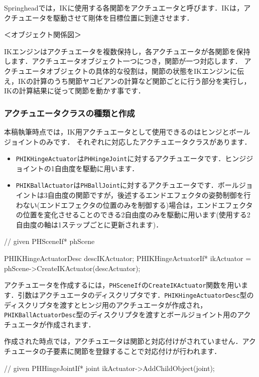 Springheadでは，IKに使用する各関節をアクチュエータと呼びます．IKは，アクチュエータを駆動させて剛体を目標位置に到達させます．

\KLUDGE ＜オブジェクト関係図＞

IKエンジンはアクチュエータを複数保持し，各アクチュエータが各関節を保持します．アクチュエータオブジェクト一つにつき，関節が一つ対応します．
\KLUDGE アクチュエータオブジェクトの具体的な役割は，関節の状態をIKエンジンに伝え，IKの計算のうち関節ヤコビアンの計算など関節ごとに行う部分を実行し，IKの計算結果に従って関節を動かす事です．


\KLUDGE %
\KLUDGE %
\subsubsection*{アクチュエータクラスの種類と作成}

\KLUDGE 本稿執筆時点では，IK用アクチュエータとして使用できるのはヒンジとボールジョイントのみです．
\KLUDGE それぞれに対応したアクチュエータクラスがあります．

\begin{itemize}
\item \texttt{PHIKHingeActuator}は\texttt{PHHingeJoint}に対するアクチュエータです．ヒンジジョイントの1自由度を駆動に用います．

\item \texttt{PHIKBallActuator}は\texttt{PHBallJoint}に対するアクチュエータです．ボールジョイントは3自由度の関節ですが，後述するエンドエフェクタの姿勢制御を行わない(エンドエフェクタの位置のみを制御する)場合は，エンドエフェクタの位置を変化させることのできる2自由度のみを駆動に用います(使用する2自由度の軸は1ステップごとに更新されます)．
\end{itemize}

\begin{sourcecode}
// given PHSceneIf* phScene

PHIKHingeActuatorDesc descIKActuator;
PHIKHingeActuatorIf* ikActuator
    = phScene->CreateIKActuator(descActuator);
\end{sourcecode}
\KLUDGE アクチュエータを作成するには，\texttt{PHSceneIf}の\texttt{CreateIKActuator}関数を用います．引数はアクチュエータのディスクリプタです．\texttt{PHIKHingeActuatorDesc}型のディスクリプタを渡すとヒンジ用のアクチュエータが作成され，\texttt{PHIKBallActuatorDesc}型のディスクリプタを渡すとボールジョイント用のアクチュエータが作成されます．

\KLUDGE 作成された時点では，アクチュエータは関節と対応付けがされていません．アクチュエータの子要素に関節を登録することで対応付けが行われます．
\begin{sourcecode}
// given PHHingeJointIf* joint
ikActuator->AddChildObject(joint);
\end{sourcecode}


